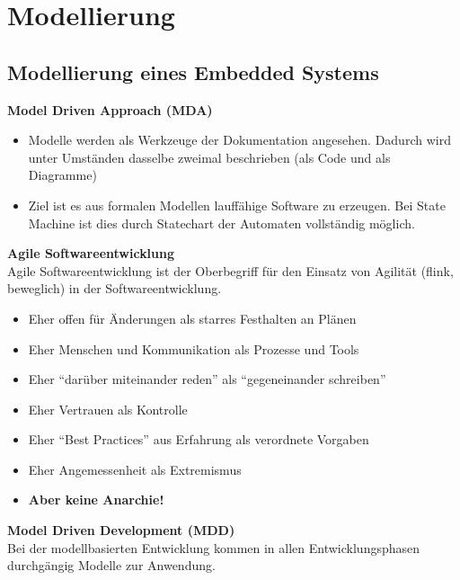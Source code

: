 \section{Modellierung}
\subsection{Modellierung eines Embedded Systems}

\textbf{Model Driven Approach (MDA)}
\begin{itemize}
	\item Modelle werden als Werkzeuge der Dokumentation angesehen. Dadurch wird unter Umständen dasselbe zweimal beschrieben (als Code und als Diagramme)
	
	\item Ziel ist es aus formalen Modellen lauffähige Software zu erzeugen. Bei State Machine ist dies durch Statechart der Automaten vollständig möglich.
\end{itemize}

\textbf{Agile Softwareentwicklung}\\
Agile Softwareentwicklung ist der Oberbegriff für den Einsatz von Agilität (flink, beweglich) in der Softwareentwicklung.
\begin{itemize}
	\item Eher offen für Änderungen als starres Festhalten an Plänen
	\item Eher Menschen und Kommunikation als Prozesse und Tools
	\item Eher "`darüber miteinander reden"' als "`gegeneinander schreiben"'
	\item Eher Vertrauen als Kontrolle
	\item Eher "`Best Practices"' aus Erfahrung als verordnete Vorgaben
	\item Eher Angemessenheit als Extremismus
	\item \textbf{Aber keine Anarchie!}
\end{itemize} 

\textbf{Model Driven Development (MDD)}\\
Bei der modellbasierten Entwicklung kommen in allen Entwicklungsphasen durchgängig Modelle zur Anwendung.


